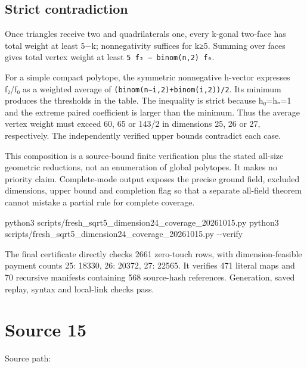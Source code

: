 \documentclass[
  10pt,
]{report}
\newenvironment{Shaded}{}{}
\newcommand{\AttributeTok}[1]{\textcolor[rgb]{0.49,0.56,0.16}{#1}}
\newcommand{\ExtensionTok}[1]{#1}
\newcommand{\NormalTok}[1]{#1}
\begin{document}
\section{Strict contradiction}\label{strict-contradiction}

Once triangles receive two and quadrilaterals one, every k-gonal
two-face has total weight at least 5−k; nonnegativity suffices for k≥5.
Summing over faces gives total vertex weight at least
\texttt{5\ f₂\ −\ binom(n,2)\ f₀}.

For a simple compact polytope, the symmetric nonnegative h-vector
expresses f₂/f₀ as a weighted average of
\texttt{(binom(n−i,2)+binom(i,2))/2}. Its minimum produces the
thresholds in the table. The inequality is strict because h₀=hₙ=1 and
the extreme paired coefficient is larger than the minimum. Thus the
average vertex weight must exceed 60, 65 or 143/2 in dimensions 25, 26
or 27, respectively. The independently verified upper bounds contradict
each case.

This composition is a source-bound finite verification plus the stated
all-size geometric reductions, not an enumeration of global polytopes.
It makes no priority claim. Complete-mode output exposes the precise
ground field, excluded dimensions, upper bound and completion flag so
that a separate all-field theorem cannot mistake a partial rule for
complete coverage.

\begin{Shaded}
\begin{Highlighting}[]
\ExtensionTok{python3}\NormalTok{ scripts/fresh\_sqrt5\_dimension24\_coverage\_20261015.py}
\ExtensionTok{python3}\NormalTok{ scripts/fresh\_sqrt5\_dimension24\_coverage\_20261015.py }\AttributeTok{{-}{-}verify}
\end{Highlighting}
\end{Shaded}

The final certificate directly checks 2661 zero-touch rows, with
dimension-feasible payment counts 25: 18330, 26: 20372, 27: 22565. It
verifies 471 literal maps and 70 recursive manifests containing 568
source-hash references. Generation, saved replay, syntax and local-link
checks pass.

\clearpage

\chapter{Source 15}\label{source-15}

Source path: 
\end{document}
